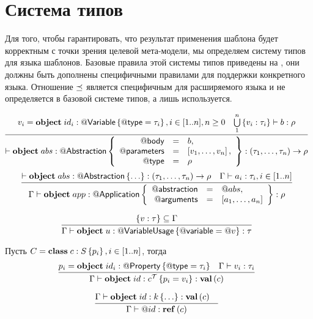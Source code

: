 \section{Система типов}

Для того, чтобы гарантировать, что результат применения шаблона будет корректным с точки зрения целевой мета-модели, мы определяем систему типов для языка шаблонов. Базовые правила этой системы типов приведены на , они должны быть дополнены специфичными правилами для поддержки конкретного языка. Отношение $\preceq$ является специфичным для расширяемого языка и не определяется в базовой системе типов, а лишь используется.

{\small
$$
\trule{
	v_i = \Object{id_i}{\RefSt{Variable}}{\RefSt{type} = \tau_i}, i \in [1..n], n \ge 0
	&
	\bigcup\limits_1^n \left\{ v_i : \tau_i \right\} \vdash b : \rho
}{
	\vdash \Object{abs}{\RefSt{Abstraction}}{
		\begin{array}{rcl}
			\RefSt{body} &=& b,\\
			\RefSt{parameters} &=& \List{v_1, \ldots, v_n},\\
			\RefSt{type} &=& \rho\\
		\end{array}	
	} : (\tau_1, \ldots, \tau_n) \rightarrow \rho
}{}
$$}
{\small
$$
\trule{
	\vdash \Object{abs}{\RefSt{Abstraction}}{\ldots
	} : (\tau_1, \ldots, \tau_n) \rightarrow \rho
	&
	\Gamma \vdash a_i : \tau_i, i \in [1..n]
}{
	\Gamma \vdash
		\Object{app}{\RefSt{Application}}{
			\begin{array}{rcl}
				\RefSt{abstraction} &=& \Ref{abs},\\
				\RefSt{arguments} &=& \List{a_1, \ldots, a_n}
			\end{array}	
		}
	: \rho
}{}
$$}

$$
\trule{
	\{v : \tau\} \subseteq \Gamma
}{
	\Gamma \vdash 
		\Object{u}{\RefSt{VariableUsage}}{\RefSt{variable} = \Ref{v}} : \tau
}{}
$$ 

Пусть $C = \mathbf{class}\;c : S \left\{p_i\right\}, i \in [1..n]$, тогда
$$
\trule{
	p_i = \Object{id_i}{\RefSt{Property}}{\RefSt{type} = \tau_i} &
	\Gamma \vdash v_i : \tau_i
}{
	\Gamma \vdash \Object{id}{c^\mathcal{T}}{p_i = v_i} : \ClassT{c}
}{}
$$ 

$$
\trule{
	\Gamma \vdash \Object{id}{k}{\ldots} : \ClassT{c} &
}{
	\Gamma \vdash \Ref{id} : \RefT{c}
}{}
$$ 

